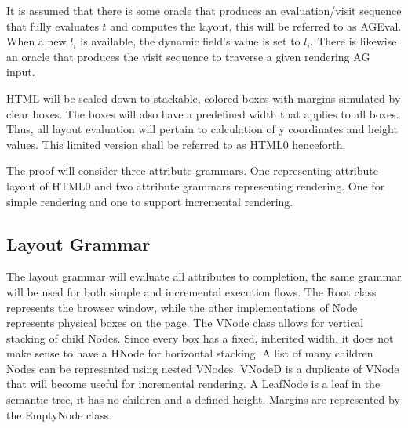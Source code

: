 \documentclass[11pt]{article}
\begin{document}
It is assumed that there is some oracle that produces an evaluation/visit sequence that fully evaluates $t$ and computes the layout, this will be referred to as AGEval. When a new $l_i$ is available, the dynamic field's value is set to $l_i$. There is likewise an oracle that produces the visit sequence to traverse a given rendering AG input.

HTML will be scaled down to stackable, colored boxes with margins simulated by clear boxes. The boxes will also have a predefined width that applies to all boxes. Thus, all layout evaluation will pertain to calculation of y coordinates and height values. This limited version shall be referred to as HTML0 henceforth.

The proof will consider three attribute grammars. One representing attribute layout of HTML0 and two attribute grammars representing rendering. One for simple rendering and one to support incremental rendering.

\subsection{Layout Grammar}

The layout grammar will evaluate all attributes to completion, the same grammar will be used for both simple and incremental execution flows. The Root class represents the browser window, while the other implementations of Node represents physical boxes on the page. The VNode class allows for vertical stacking of child Nodes. Since every box has a fixed, inherited width, it does not make sense to have a HNode for horizontal stacking. A list of many children Nodes can be represented using nested VNodes. VNodeD is a duplicate of VNode that will become useful for incremental rendering. A LeafNode is a leaf in the semantic tree, it has no children and a defined height. Margins are represented by the EmptyNode class.
 
\end{document}
